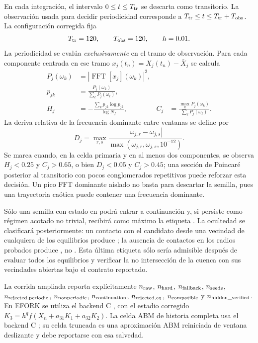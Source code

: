 \documentclass[journal]{IEEEtran}
\begin{document}
En cada integración, el intervalo \(0\leq t\leq T_{\rm tr}\) se descarta
como transitorio. La observación usada para decidir periodicidad corresponde
a \(T_{\rm tr}\leq t\leq T_{\rm tr}+T_{\rm obs}\).
La configuración corregida fija
\[
T_{\rm tr}=120,\qquad T_{\rm obs}=120,\qquad h=0.01.
\]
La periodicidad se evalúa \emph{exclusivamente} en el tramo de observación.
Para cada componente centrada en ese tramo
\(x_j(t_n)=X_j(t_n)-\overline X_j\) se calcula
\begin{equation}
\begin{aligned}
 P_j(\omega_k)&=|\operatorname{FFT}[x_j](\omega_k)|^2,\\
 p_{jk}&=\frac{P_j(\omega_k)}{\sum_\ell P_j(\omega_\ell)},\\
 H_j&=-\frac{\sum_kp_{jk}\log p_{jk}}{\log N_f},&
 C_j&=\frac{\max_kP_j(\omega_k)}{\sum_\ell P_j(\omega_\ell)}.
\end{aligned}
\end{equation}
La deriva relativa de la frecuencia dominante entre ventanas se define por
\begin{equation}
 D_j=\max_{r,s}
 \frac{|\omega_{j,r}-\omega_{j,s}|}
 {\max(\omega_{j,r},\omega_{j,s},10^{-12})}.
\end{equation}
Se marca  cuando, en la celda primaria
 y en al menos dos componentes,
se observa \(H_j<0.25\) y \(C_j>0.65\), o bien
\(D_j<0.05\) y \(C_j>0.45\); una sección de Poincaré posterior al transitorio con pocos
conglomerados repetitivos puede reforzar esta decisión. Un pico FFT dominante
aislado no basta para descartar la semilla, pues una trayectoria caótica puede
contener una frecuencia dominante.

Sólo una semilla con estado  en
 podrá entrar a
continuación y, si persiste como régimen acotado no trivial, recibirá como
máximo la etiqueta . La ocultedad se clasificará
posteriormente: un contacto con el candidato desde una vecindad de cualquiera
de los equilibrios produce
; la ausencia de contactos en los
radios probados produce
, no
. Esta última etiqueta sólo sería admisible después de
evaluar todos los equilibrios y verificar la no intersección de la cuenca con
sus vecindades abiertas bajo el contrato reportado.

La corrida ampliada reporta explícitamente
\(n_{\rm raw}\), \(n_{\rm hard}\), \(n_{\rm fallback}\),
\(n_{\rm seeds}\), \(n_{\rm rejected,periodic}\),
\(n_{\rm nonperiodic}\), \(n_{\rm continuation}\),
\(n_{\rm rejected,eq}\), \(n_{\rm compatible}\) y
\(n_{\rm hidden\_verified}\). En EFORK se utiliza el backend C
, con el estadio corregido
\(K_3=h^qf(X_n+a_{31}K_1+a_{32}K_2)\).
La celda ABM de historia completa usa el backend C
; su celda truncada es una aproximación ABM
reiniciada de ventana deslizante y debe reportarse con esa salvedad.
\end{document}
